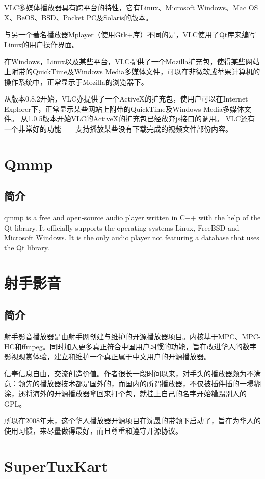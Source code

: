 \documentclass[paper=a4,fontsize=11pt]{article}
\begin{document}
	VLC多媒体播放器具有跨平台的特性，它有Linux、Microsoft Windows、Mac OS X、BeOS、BSD、Pocket PC及Solaris的版本。
	
	与另一个著名播放器Mplayer（使用Gtk+库）不同的是，VLC使用了Qt库来编写Linux的用户操作界面。
	
	在Windows，Linux以及某些平台，VLC提供了一个Mozilla扩充包，使得某些网站上附带的QuickTime及Windows Media多媒体文件，可以在非微软或苹果计算机的操作系统中，正常显示于Mozilla的浏览器下。
	
	从版本0.8.2开始，VLC亦提供了一个ActiveX的扩充包，使用户可以在Internet Explorer下，正常显示某些网站上附带的QuickTime及Windows Media多媒体文件。
	从1.0.5版本开始VLC的ActiveX的扩充包已经放弃js接口的调用。
	VLC还有一个非常好的功能——支持播放某些没有下载完成的视频文件部份内容。
	
	\section{Qmmp}
	
	\subsection{简介}
	qmmp is a free and open-source audio player written in C++ with the help of the Qt library. It officially supports the operating systems Linux, FreeBSD and Microsoft Windows. It is the only audio player not featuring a database that uses the Qt library.
	
	\section{射手影音}
	
	\subsection{简介}
	射手影音播放器是由射手网创建与维护的开源播放器项目。内核基于MPC、MPC-HC和ffmpeg。同时加入更多真正符合中国用户习惯的功能，旨在改进华人的数字影视观赏体验，建立和维护一个真正属于中文用户的开源播放器。
	
	信奉信息自由，交流创造价值。作者很长一段时间以来，对手头的播放器颇为不满意：领先的播放器技术都是国外的，而国内的所谓播放器，不仅被插件插的一塌糊涂，还将海外的开源播放器拿回来打个包，就挂上自己的名字开始糟蹋别人的GPL。
	
	所以在2008年末，这个华人播放器开源项目在沈晟的带领下启动了，旨在为华人的使用习惯，来尽量做得最好，而且尊重和遵守开源协议。
			
	\section{SuperTuxKart}
	
\end{document}
